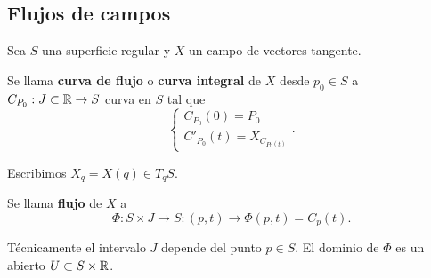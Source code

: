 \subsection{Flujos de campos}
Sea $\displaystyle S $ una superficie regular y $\displaystyle X $ un campo de vectores tangente. 
\begin{definition}
Se llama \textbf{curva de flujo} o \textbf{curva integral} de $\displaystyle X $ desde $\displaystyle p_{0} \in S $ a $\displaystyle C_{P_{0}} : J \subset \mathbb{R} \to S $ curva en $\displaystyle S $ tal que 
\[
\begin{cases}
C_{P_{0}}\left(0\right)=P_{0} \\
C'_{P_{0}}\left(t\right)=X_{C_{P_{0}\left(t\right)}}
\end{cases}
.\]
\end{definition}
\begin{notation}
Escribimos $\displaystyle X_{q}= X\left(q\right)\in T_{q}S $.
\end{notation}
\begin{definition}[Flujo]
Se llama \textbf{flujo} de $\displaystyle X $ a 
\[\Phi : S \times J \to S : \left(p, t\right)\to \Phi\left(p,t\right)=C_{p}\left(t\right) .\]
\end{definition}
\begin{observation}
Técnicamente el intervalo $\displaystyle J $ depende del punto $\displaystyle p \in S $. El dominio de $\displaystyle \Phi $ es un abierto $\displaystyle U \subset S \times \mathbb{R} $. 
\end{observation}
